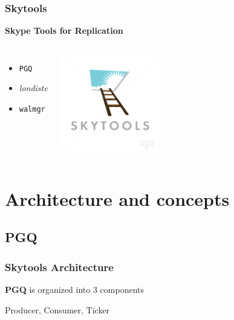 \documentclass{beamer}
\begin{document}
\begin{frame}[fragile]
  \frametitle{Skytools}

  \begin{center}
    \textbf{Skype Tools for Replication}
  \end{center}
  \vfill

\begin{columns}[c]

  \begin{itemize}
   \item \texttt{PGQ}
   \item \textit{londiste}
   \item \texttt{walmgr}
  \end{itemize}  

\begin{center}
  \includegraphics[height=1.7in]{skytools3.png}
\end{center}
\end{columns}
\end{frame}

\section{Architecture and concepts}
\subsection{PGQ}

\begin{frame}[fragile]
  \frametitle{Skytools Architecture}

  \begin{center}
    \textbf{PGQ} is organized into 3 components
    \vfill

    Producer, Consumer, Ticker
  \end{center}
\end{frame}
\end{document}
